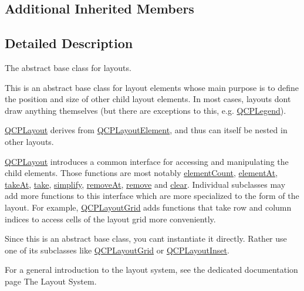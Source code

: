 \subsection*{Additional Inherited Members}


\subsection{Detailed Description}
The abstract base class for layouts. 

This is an abstract base class for layout elements whose main purpose is to define the position and size of other child layout elements. In most cases, layouts don\textquotesingle{}t draw anything themselves (but there are exceptions to this, e.\+g. \mbox{\hyperlink{class_q_c_p_legend}{Q\+C\+P\+Legend}}).

\mbox{\hyperlink{class_q_c_p_layout}{Q\+C\+P\+Layout}} derives from \mbox{\hyperlink{class_q_c_p_layout_element}{Q\+C\+P\+Layout\+Element}}, and thus can itself be nested in other layouts.

\mbox{\hyperlink{class_q_c_p_layout}{Q\+C\+P\+Layout}} introduces a common interface for accessing and manipulating the child elements. Those functions are most notably \mbox{\hyperlink{class_q_c_p_layout_a39d3e9ef5d9b82ab1885ba1cb9597e56}{element\+Count}}, \mbox{\hyperlink{class_q_c_p_layout_afa73ca7d859f8a3ee5c73c9b353d2a56}{element\+At}}, \mbox{\hyperlink{class_q_c_p_layout_a5a79621fa0a6eabb8b520cfc04fb601a}{take\+At}}, \mbox{\hyperlink{class_q_c_p_layout_ada26cd17e56472b0b4d7fbbc96873e4c}{take}}, \mbox{\hyperlink{class_q_c_p_layout_a41e6ac049143866e8f8b4964efab01b2}{simplify}}, \mbox{\hyperlink{class_q_c_p_layout_a2403f684fee3ce47132faaeed00bb066}{remove\+At}}, \mbox{\hyperlink{class_q_c_p_layout_a6c58f537d8086f352576ab7c5b15d0bc}{remove}} and \mbox{\hyperlink{class_q_c_p_layout_a02883bdf2769b5b227f0232dba1ac4ee}{clear}}. Individual subclasses may add more functions to this interface which are more specialized to the form of the layout. For example, \mbox{\hyperlink{class_q_c_p_layout_grid}{Q\+C\+P\+Layout\+Grid}} adds functions that take row and column indices to access cells of the layout grid more conveniently.

Since this is an abstract base class, you can\textquotesingle{}t instantiate it directly. Rather use one of its subclasses like \mbox{\hyperlink{class_q_c_p_layout_grid}{Q\+C\+P\+Layout\+Grid}} or \mbox{\hyperlink{class_q_c_p_layout_inset}{Q\+C\+P\+Layout\+Inset}}.

For a general introduction to the layout system, see the dedicated documentation page The Layout System. 

